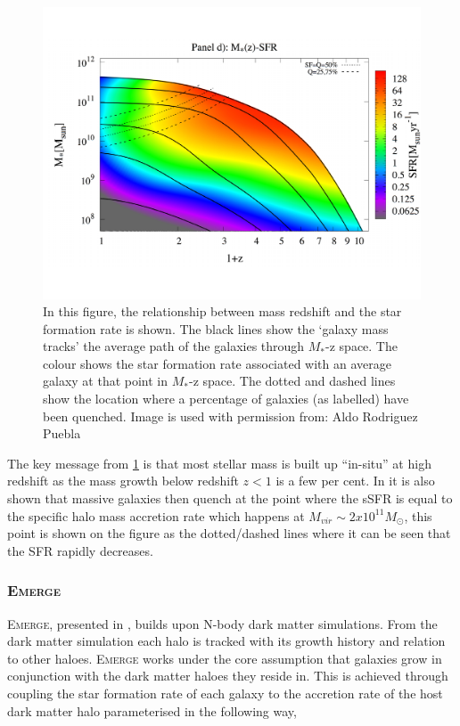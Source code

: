 \begin{figure}[h]
    \centering
    \includegraphics[width = \linewidth]{Figures/Chapter1/RP17_fig9.pdf}
    \caption{In this figure, the relationship between mass redshift and the star formation rate is shown. The black lines show the `galaxy mass tracks' the average path of the galaxies through $M_*$-z space. The colour shows the star formation rate associated with an average galaxy at that point in $M_*$-z space. The dotted and dashed lines show the location where a percentage of galaxies (as labelled) have been quenched.
    Image is used with permission from: Aldo Rodriguez Puebla \cite{Rodriguez-Puebla2017ConstrainingProperties}}
    \label{fig:RP_fig}
\end{figure}


The key message from \ref{fig:RP_fig} is that most stellar mass is built up ``in-situ'' at high redshift as the mass growth below redshift $z<1$ is a few per cent. In \citet{Rodriguez-Puebla2017ConstrainingProperties} it is also shown that massive galaxies then quench at the point where the sSFR is equal to the specific halo mass accretion rate which happens at $M_{vir} \sim 2 x 10^{11} M_{\odot}$, this point is shown on the figure as the dotted/dashed lines where it can be seen that the SFR rapidly decreases.


\subsubsection{E\textsc{merge}}
E\textsc{merge}, presented in \citet{Moster2018Emerge10}, builds upon N-body dark matter simulations. From the dark matter simulation each halo is tracked with its growth history and relation to other haloes. E\textsc{merge} works under the core assumption that galaxies grow in conjunction with the dark matter haloes they reside in. This is achieved through coupling the star formation rate of each galaxy to the accretion rate of the host dark matter halo parameterised in the following way,

